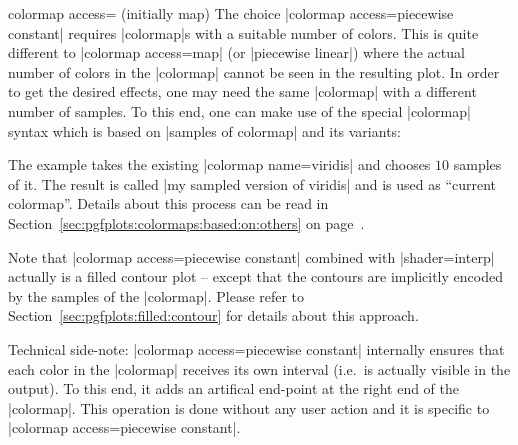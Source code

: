 \begin{pgfplotskey}{colormap access= (initially map)}
	The choice |colormap access=piecewise constant| requires |colormap|s with a suitable number of colors. This is quite different to |colormap access=map| (or |piecewise linear|) where the actual number of colors in the |colormap| cannot be seen in the resulting plot. In order to get the desired effects, one may need the same |colormap| with a different number of samples. To this end, one can make use of the special |colormap| syntax which is based on |samples of colormap| and its variants:

\begin{codeexample}[]
\end{codeexample}
	The example takes the existing |colormap name=viridis| and chooses $10$ samples of it. The result is called |my sampled version of viridis| and is used as ``current colormap''. Details about this process can be read in Section~\ref{sec:pgfplots:colormaps:based:on:others} on page~\pageref{sec:pgfplots:colormaps:based:on:others}.

	Note that |colormap access=piecewise constant| combined with |shader=interp| actually is a filled contour plot -- except that the contours are implicitly encoded by the samples of the |colormap|. Please refer to Section~\ref{sec:pgfplots:filled:contour} for details about this approach.

	Technical side-note: |colormap access=piecewise constant| internally ensures that each color in the |colormap| receives its own interval (i.e.\ is actually visible in the output). To this end, it adds an artifical end-point at the right end of the |colormap|. This operation is done without any user action and it is specific to |colormap access=piecewise constant|.
\end{pgfplotskey}
